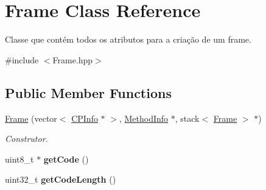 \hypertarget{classFrame}{}\section{Frame Class Reference}
\label{classFrame}


Classe que contém todos os atributos para a criação de um frame.  




{\ttfamily \#include $<$Frame.\+hpp$>$}

\subsection*{Public Member Functions}
\begin{DoxyCompactItemize}
\item 
\hyperlink{classFrame_a422ab83c8b29489601a4bac02d4e171e}{Frame} (vector$<$ \hyperlink{classCPInfo}{C\+P\+Info} $\ast$ $>$, \hyperlink{classMethodInfo}{Method\+Info} $\ast$, stack$<$ \hyperlink{classFrame}{Frame} $>$ $\ast$)
\begin{DoxyCompactList}\small\item\em Construtor. \end{DoxyCompactList}\item 
uint8\+\_\+t $\ast$ {\bfseries get\+Code} ()\hypertarget{classFrame_aac40e0ebfeb7b3298b59c37a7f4e3006}{}\label{classFrame_aac40e0ebfeb7b3298b59c37a7f4e3006}

\item 
uint32\+\_\+t {\bfseries get\+Code\+Length} ()\hypertarget{classFrame_a9233523486da4fa4ac786883f519fe17}{}\label{classFrame_a9233523486da4fa4ac786883f519fe17}

\end{DoxyCompactItemize}
